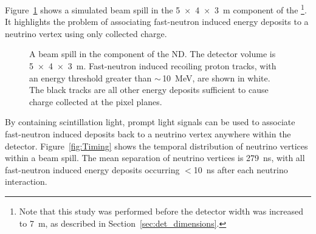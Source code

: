 Figure~\ref{fig:NDSpill} shows a simulated beam spill in the \SI[product-units=repeat]{5x4x3}{\metre}  component of the   \footnote{Note that this study was performed before the detector width was increased to \SI{7}{m}, as described in Section~\ref{sec:det_dimensions}.}. 
It highlights the problem of associating fast-neutron induced energy deposits to a neutrino vertex using only collected charge.  

\begin{figure}[htb]
	\caption{A beam spill in the  component of the  ND. 
		The detector volume is \SI[product-units=repeat]{5x4x3}{\metre}.
		Fast-neutron induced recoiling proton tracks, with an energy threshold greater than $\sim\,$\SI{10}{\mega\electronvolt}, are shown in white.
		The black tracks are all other energy deposits sufficient to cause charge collected at the pixel planes.}
	\label{fig:NDSpill}
\end{figure}

By containing scintillation light, prompt light signals can be used to associate fast-neutron induced deposits back to a neutrino vertex anywhere within the detector.
Figure~\ref{fig:Timing} shows the temporal distribution of neutrino vertices within a beam spill.
The mean separation of neutrino vertices is \SI{279}{\nano\second}, with all fast-neutron induced energy deposits occurring $<$\SI{10}{\nano\second} after each neutrino interaction.      

